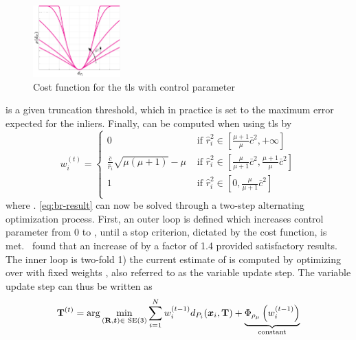 \begin{figure}[!h]
	\begin{center}
		\includegraphics[width=0.3\textwidth]{chapters/2-pose-estimation/fig/tls-cost.pdf}
	\end{center}
	\caption{Cost function for the \gls{tls} with control parameter \mvar{\mu}}
	\label{fig:tls-cost}
\end{figure}
 is a given truncation threshold, which in practice is set to the maximum error expected for the inliers. Finally,  can be computed when using \gls{tls} by
%
\begin{equation}\label{eq:tls-weights}
	w_i^{(t)} = \begin{cases}
		0 & \text{ if } \hat{r}_i^2\in\left[ \frac{\mu+1}{\mu}\bar{c}^2, +\infty \right] \\
		\frac{\bar{c}}{\hat{r}_i}\sqrt{\mu(\mu+1)} - \mu & \text{ if } \hat{r}_i^2\in\left[ \frac{\mu}{\mu+1}\bar{c}^2, \frac{\mu + 1}{\mu}\bar{c}^2 \right] \\
		1 & \text{ if } \hat{r}_i^2\in\left[ 0, \frac{\mu}{\mu + 1}\bar{c}^2 \right] \\
	\end{cases}
\end{equation}
where . \eqref{eq:br-result} can now be solved through a two-step alternating optimization process. First, an outer loop is defined which increases control parameter \mvar{\mu} from \num{0} to \mvar{\infty}, until a stop criterion, dictated by the cost function, is met.~\cite{graduated-non-convexity-for-robust-spatial-perception:-from-non-minimal-solvers-to-global-outlier-rejection} found that an increase of \mvar{\mu} by a factor of \num{1.4} provided satisfactory results.
The inner loop is two-fold 1) the current estimate of  is computed by optimizing over \tf[T]{}{} with fixed weights , also referred to as the variable update step. The variable update step can thus be written as
%
\begin{equation}\label{eq:variable-update}
	\tf[T]{(t)}{} = \arg\min_{(\mat{R},\vec{t})\in\SE (3)} \sum^N_{i=1}w_i^{(t-1)}d_{P_i}(\vec{x}_i,\mat{T}) + \underbrace{\Phi_{\rho_\mu}\left(w_i^{(t-1)}\right)}_{\text{constant}}
\end{equation}

